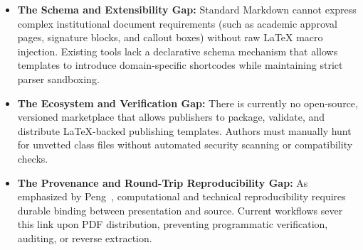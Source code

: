 \begin{itemize}[leftmargin=*]
  \item \textbf{The Schema and Extensibility Gap:} Standard Markdown cannot express complex institutional document requirements (such as academic approval pages, signature blocks, and callout boxes) without raw LaTeX macro injection. Existing tools lack a declarative schema mechanism that allows templates to introduce domain-specific shortcodes while maintaining strict parser sandboxing.
  \item \textbf{The Ecosystem and Verification Gap:} There is currently no open-source, versioned marketplace that allows publishers to package, validate, and distribute LaTeX-backed publishing templates. Authors must manually hunt for unvetted class files without automated security scanning or compatibility checks.
  \item \textbf{The Provenance and Round-Trip Reproducibility Gap:} As emphasized by Peng~\cite{peng2011reproducible}, computational and technical reproducibility requires durable binding between presentation and source. Current workflows sever this link upon PDF distribution, preventing programmatic verification, auditing, or reverse extraction.
\end{itemize}


